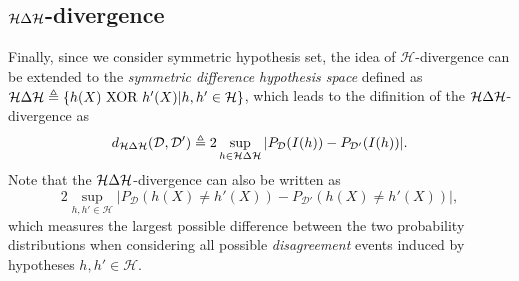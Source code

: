 \subsection{$\mathcal{H} \Delta \mathcal{H}$-divergence}
Finally, since we consider symmetric hypothesis set, the idea of $\mathcal{H}$-divergence can be extended to the \textit{symmetric difference hypothesis space} defined as $\mathcal{H} \Delta \mathcal{H} \triangleq \{ h(X) \text{ XOR } h'(X) \vert h, h' \in \mathcal{H} \}$, which leads to the difinition of the $\mathcal{H} \Delta \mathcal{H}$-divergence as
\begin{equation}\label{eq:hdh_divergence}
  d_{\mathcal{H} \Delta \mathcal{H}}(\mathcal{D}, \mathcal{D}') \triangleq 2\sup_{h \in \mathcal{H} \Delta \mathcal{H}} \vert P_{\mathcal{D}}(I(h))-P_{\mathcal{D}'}(I(h)) \vert.
\end{equation}
Note that the $\mathcal{H} \Delta \mathcal{H}$-divergence can also be written as
\begin{equation}\label{eq:hdh_divergence2}
  2\sup_{h, h' \in \mathcal{H}} \vert P_{\mathcal{D}}(h(X) \neq h'(X))-P_{\mathcal{D}'}(h(X) \neq h'(X)) \vert,
\end{equation}
which measures the largest possible difference between the two probability distributions when considering all possible \textit{disagreement} events induced by hypotheses $h,h' \in \mathcal{H}$.


